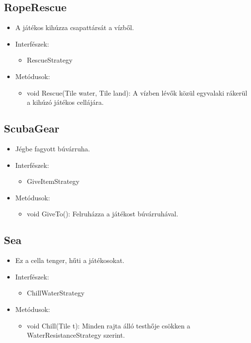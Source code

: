 \subsection{RopeRescue}
\begin{itemize}
	\item A játékos kihúzza csapattársát a vízből.
\item Interfészek:
\begin{itemize}
	\item RescueStrategy
\end{itemize}

\item Metódusok:
\begin{itemize}
	\item void Rescue(Tile water, Tile land): A vízben lévők közül egyvalaki rákerül a kihúzó játékos cellájára.
\end{itemize}
\end{itemize}

\subsection{ScubaGear}
\begin{itemize}
	\item Jégbe fagyott búvárruha.
\item Interfészek:
\begin{itemize}
	\item GiveItemStrategy
\end{itemize}
\item Metódusok:
\begin{itemize}
	\item void GiveTo(): Felruházza a játékost búvárruhával.
\end{itemize}
\end{itemize}

\subsection{Sea}
\begin{itemize}
	\item Ez a cella tenger, hűti a játékosokat.
\item Interfészek:
\begin{itemize}
	\item ChillWaterStrategy
\end{itemize}

\item Metódusok:
\begin{itemize}
	\item void Chill(Tile t): Minden rajta álló testhője csökken a WaterResistanceStrategy szerint.
\end{itemize}
\end{itemize}


